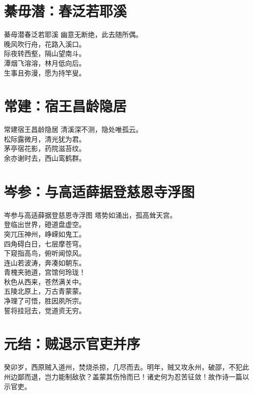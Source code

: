 \documentclass[12pt,oneside,a5paper]{book}
\begin{document}
\chapter{綦毋潜：春泛若耶溪}
\begin{poemzh}{綦毋潜}{春泛若耶溪}
幽意无断绝，此去随所偶。\\
晚风吹行舟，花路入溪口。\\
际夜转西壑，隔山望南斗。\\
潭烟飞溶溶，林月低向后。\\
生事且弥漫，愿为持竿叟。\\ 
\end{poemzh}

\chapter{常建：宿王昌龄隐居}
\begin{poemzh}{常建}{宿王昌龄隐居}
清溪深不测，隐处唯孤云。\\
松际露微月，清光犹为君。\\
茅亭宿花影，药院滋苔纹。\\
余亦谢时去，西山鸾鹤群。\\ 
\end{poemzh}

\chapter{岑参：与高适薛据登慈恩寺浮图}
\begin{poemzh}{岑参}{与高适薛据登慈恩寺浮图}
塔势如涌出，孤高耸天宫。\\
登临出世界，磴道盘虚空。\\
突兀压神州，峥嵘如鬼工。\\
四角碍白日，七层摩苍穹。\\
下窥指高鸟，俯听闻惊风。\\
连山若波涛，奔凑如朝东。\\
青槐夹驰道，宫馆何玲珑！\\
秋色从西来，苍然满关中。\\
五陵北原上，万古青蒙蒙。\\
净理了可悟，胜因夙所宗。\\
誓将挂冠去，觉道资无穷。\\ 
\end{poemzh}

\chapter{元结：贼退示官吏并序}
癸卯岁，西原贼入道州，焚烧杀掠，几尽而去。明年，贼又攻永州，破邵，不犯此州边鄙而退，岂力能制敌欤？盖蒙其伤怜而已！诸史何为忍苦征敛！故作诗一篇以示官吏。
\end{document}
